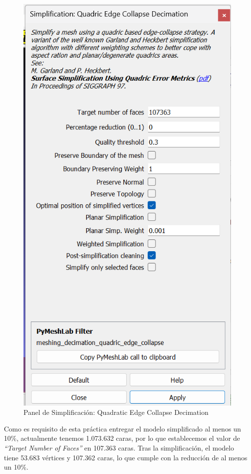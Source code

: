 \documentclass[options]{article}
\begin{document}
\begin{figure}[H]
    \centering
    \includegraphics[scale=0.65]{images/simplificacion_01.png}
    \caption{Panel de Simplificación: Quadratic Edge Collapse Decimation}
\end{figure}


Como es requisito de esta práctica entregar el modelo simplificado al menos un 10\%, actualmente tenemos 1.073.632 caras, por lo que establecemos el valor de \textit{``Target Number of Faces''} en 107.363 caras. Tras la simplificación, el modelo tiene 53.683 vértices y 107.362 caras, lo que cumple con la reducción de al menos un 10\%.
\end{document}

